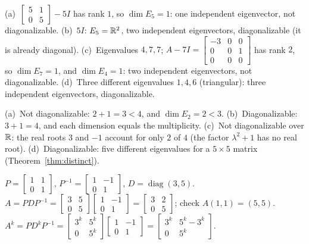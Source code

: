 \documentclass[11pt]{article}
\begin{document}
\begin{description}[leftmargin=0pt,itemsep=5pt]
  \item[Knowledge Check \ref{kc:enough}.] (a)~$\begin{bmatrix}5&1\\0&5\end{bmatrix}-5I$ has rank $1$, so $\dim E_5=1$: one independent eigenvector, not diagonalizable. (b)~$5I$: $E_5=\mathbb{R}^2$, two independent eigenvectors, diagonalizable (it is already diagonal). (c)~Eigenvalues $4,7,7$; $A-7I=\begin{bmatrix}-3&0&0\\0&0&1\\0&0&0\end{bmatrix}$ has rank $2$, so $\dim E_7=1$, and $\dim E_4=1$: two independent eigenvectors, not diagonalizable. (d)~Three different eigenvalues $1,4,6$ (triangular): three independent eigenvectors, diagonalizable.
  \item[Knowledge Check \ref{kc:decidek}.] (a)~Not diagonalizable: $2+1=3<4$, and $\dim E_2=2<3$. (b)~Diagonalizable: $3+1=4$, and each dimension equals the multiplicity. (c)~Not diagonalizable over $\mathbb{R}$: the real roots $3$ and $-1$ account for only $2$ of $4$ (the factor $\lambda^2+1$ has no real root). (d)~Diagonalizable: five different eigenvalues for a $5\times5$ matrix (Theorem~\ref{thm:distinct}).
  \item[Knowledge Check \ref{kc:buildk}.] $P=\begin{bmatrix}1&1\\0&1\end{bmatrix}$, $P^{-1}=\begin{bmatrix}1&-1\\0&1\end{bmatrix}$, $D=\operatorname{diag}(3,5)$. $A=PDP^{-1}=\begin{bmatrix}3&5\\0&5\end{bmatrix}\begin{bmatrix}1&-1\\0&1\end{bmatrix}=\begin{bmatrix}3&2\\0&5\end{bmatrix}$; check $A(1,1)=(5,5)$. $A^k=P D^kP^{-1}=\begin{bmatrix}3^k&5^k\\0&5^k\end{bmatrix}\begin{bmatrix}1&-1\\0&1\end{bmatrix}=\begin{bmatrix}3^k&5^k-3^k\\0&5^k\end{bmatrix}$.

\end{description}
\end{document}
